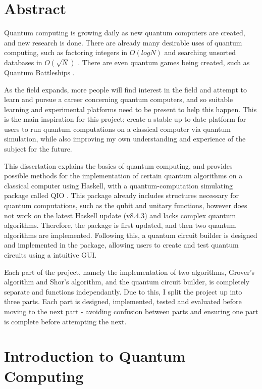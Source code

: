 \documentclass[a4paper,10pt, titlepage, twoside]{article}
\begin{document}
\section*{Abstract}
Quantum computing is growing daily as new quantum computers are created, and new research is done. There are already many desirable uses of quantum computing, such as factoring integers in $O(log N)$ \cite{shor} and searching unsorted databases in $O(\sqrt{N})$ \cite{grover}. There are even quantum games being created, such as Quantum Battleships \cite{qships}. \par
As the field expands, more people will find interest in the field and attempt to learn and pursue a career concerning quantum computers, and so suitable learning and experimental platforms need to be present to help this happen. This is the main inspiration for this project; create a stable up-to-date platform for users to run quantum computations on a classical computer via quantum simulation, while also improving my own understanding and experience of the subject for the future.\par
This dissertation explains the basics of quantum computing, and provides possible methods for the implementation of certain quantum algorithms on a classical computer using Haskell, with a quantum-computation simulating package called QIO \cite{qio}. This package already includes structures necessary for quantum computations, such as the qubit and unitary functions, however does not work on the latest Haskell update (v8.4.3) and lacks complex quantum algorithms. Therefore, the package is first updated, and then two quantum algorithms are implemented. Following this, a quantum circuit builder is designed and implemented in the package, allowing users to create and test quantum circuits using a intuitive GUI.\par
Each part of the project, namely the implementation of two algorithms, Grover's algorithm and Shor's algorithm, and the quantum circuit builder, is completely separate and functions independantly. Due to this, I split the project up into three parts. Each part is designed, implemented, tested and evaluated before moving to the next part - avoiding confusion between parts and ensuring one part is complete before attempting the next.
\newpage

\fancyhead[RE, LO]{\leftmark}
\tableofcontents
\clearpage
\fancyfoot[CE,CO]{\thepage}

\setcounter{page}{1}
\section{Introduction to Quantum Computing}
\end{document}
